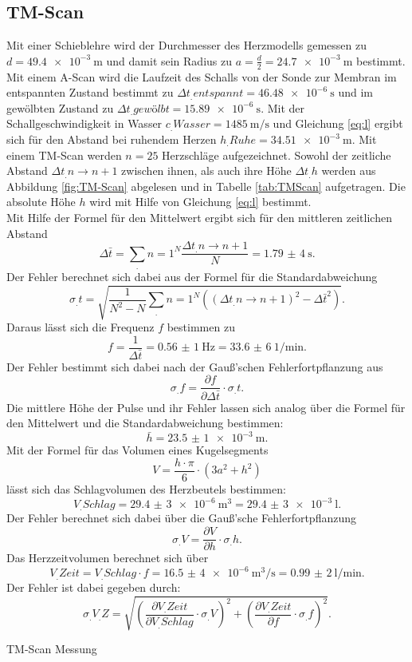 \subsection{TM-Scan}
Mit einer Schieblehre wird der Durchmesser des Herzmodells gemessen zu $d=\SI{49,4e-3}{\metre}$ und damit sein Radius zu $a=\frac{d}{2}=\SI{24,7e-3}{\metre}$ bestimmt.
Mit einem A-Scan wird die Laufzeit des Schalls von der Sonde zur Membran im entspannten Zustand bestimmt zu $\Delta t_.{entspannt}= \SI{46,48e-6}{\second}$ und im gewölbten Zustand zu $\Delta t_.{gewölbt}= \SI{15,89e-6}{\second}$.\newline
Mit der Schallgeschwindigkeit in Wasser $c_.{Wasser}=\SI{1485}{\metre\per\second}$ und Gleichung \eqref{eq:l} ergibt sich für den Abstand bei ruhendem Herzen $h_.{Ruhe} = \SI{34,51e-3}{\metre}$.
Mit einem TM-Scan werden $n=25$ Herzschläge aufgezeichnet. Sowohl der zeitliche Abstand $\Delta t_.{n\rightarrow n+1}$ zwischen ihnen, als auch ihre Höhe $\Delta t_.h$ werden aus Abbildung \ref{fig:TM-Scan} abgelesen und in Tabelle \ref{tab:TMScan} aufgetragen.
Die absolute Höhe $h$ wird mit Hilfe von Gleichung \ref{eq:l} bestimmt.\\
Mit Hilfe der Formel für den Mittelwert ergibt sich für den mittleren zeitlichen Abstand
\[
\Delta\bar{t}= \sum_.{n=1}^N \frac{\Delta t_.{n\rightarrow n+1}}{N} = \SI{1,79(4)}{\second} \text{.}
\]
Der Fehler berechnet sich dabei aus der Formel für die Standardabweichung
\[
\sigma_.t=\sqrt{\frac{1}{N^2-N}\sum_.n=1^N ((\Delta t_.{n\rightarrow n+1})^2-\Delta\bar{t}^2)} \text{.}
\]
Daraus lässt sich die Frequenz $f$ bestimmen zu
\[
f=\frac{1}{\Delta\bar{t}}= \SI{0,56(1)}{\hertz}=\SI{33,6(6)}{1\per\minute} \text{.}
\]
Der Fehler bestimmt sich dabei nach der Gauß'schen Fehlerfortpflanzung aus
\[
\sigma_.f=\frac{\partial f}{\partial \Delta\bar{t}}\cdot \sigma_.t \text{.}
\]
Die mittlere Höhe der Pulse und ihr Fehler lassen sich analog über die Formel für den Mittelwert und die Standardabweichung bestimmen:
\[
\bar{h}=\SI{23,5(1)e-3}{\metre}\text{.}
\]
Mit der Formel für das Volumen eines Kugelsegments
\[
V=\frac{h\cdot\pi}{6}\cdot\left(3a^2+h^2\right)
\]
lässt sich das Schlagvolumen des Herzbeutels bestimmen:
\[
V_.{Schlag}=\SI{29,4(3)e-6}{\cubic\metre}=\SI{29,4(3)e-3}{\litre}\text{.}
\]
Der Fehler berechnet sich dabei über die Gauß'sche Fehlerfortpflanzung
\[
\sigma_.V=\frac{\partial V}{\partial h}\cdot\sigma_.h \text{.}
\]
Das Herzzeitvolumen berechnet sich über
\[
V_.{Zeit} = V_.{Schlag} \cdot f =\SI{16,5(4)e-6}{\cubic\metre\per\second} = \SI{0,99(2)}{\litre\per\minute}\text{.}
\]
Der Fehler ist dabei gegeben durch:
\[
\sigma_.{V_.Z}= \sqrt{\left(\frac{\partial V_.{Zeit}}{\partial V_.{Schlag}}\cdot \sigma_.V\right)^2+\left(\frac{\partial V_.{Zeit}}{\partial f}\cdot \sigma_.f\right)^2}\text{.}
\]
\begin{table}
	\centering
	\caption{TM-Scan Messung}
	
	\label{tab:TMScan}
\end{table}

